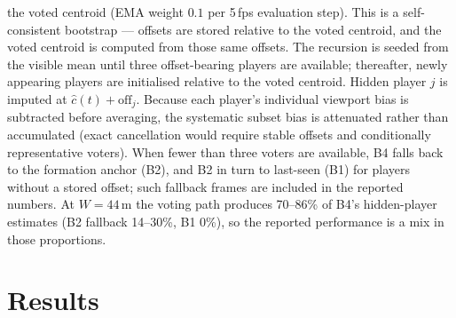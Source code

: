 \documentclass[11pt]{article}
\begin{document}
\begin{description}
the voted centroid (EMA weight $0.1$ per 5\,fps evaluation step). This is a self-consistent bootstrap --- offsets are stored
relative to the voted centroid, and the voted centroid is computed from those
same offsets. The recursion is seeded from the visible mean until three
offset-bearing players are available; thereafter, newly appearing players are
initialised relative to the voted centroid. Hidden player $j$ is imputed at
$\hat{c}(t) + \mathrm{off}_j$. Because each player's individual viewport bias
is subtracted before averaging, the systematic subset bias is attenuated rather
than accumulated (exact cancellation would require stable offsets and
conditionally representative voters). When fewer than three voters are available, B4 falls back to the
formation anchor (B2), and B2 in turn to last-seen (B1) for players without a
stored offset; such fallback frames are included in the reported numbers. At
$W = 44$\,m the voting path produces 70--86\% of B4's hidden-player estimates
(B2 fallback 14--30\%, B1 0\%), so the reported performance is a mix in those
proportions.
\end{description}

\section{Results}
\label{sec:results}
\end{document}
